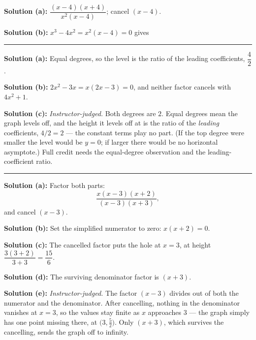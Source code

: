 \documentclass[12pt]{article}
\begin{document}

\textbf{Solution (a):} $\dfrac{(x-4)(x+4)}{x^2(x-4)}$; cancel $(x-4)$.

\textbf{Solution (b):} $x^3 - 4x^2 = x^2(x-4) = 0$ gives

\vspace{0.2cm}\noindent\rule{\linewidth}{0.2pt}\vspace{0.2cm}


\textbf{Solution (a):} Equal degrees, so the level is the ratio of the leading
coefficients, $\dfrac{4}{2}$. 

\textbf{Solution (b):} $2x^2 - 3x = x(2x-3) = 0$, and neither factor cancels with
$4x^2+1$. 

\textbf{Solution (c):} \emph{Instructor-judged.} Both degrees are $2$. Equal
degrees mean the graph levels off, and the height it levels off at is the ratio
of the \emph{leading} coefficients, $4/2 = 2$ --- the constant terms play no part.
(If the top degree were smaller the level would be $y=0$; if larger there would
be no horizontal asymptote.) Full credit needs the equal-degree observation and
the leading-coefficient ratio.

\vspace{0.2cm}\noindent\rule{\linewidth}{0.2pt}\vspace{0.2cm}


\textbf{Solution (a):} Factor both parts:
\[ \frac{x(x-3)(x+2)}{(x-3)(x+3)} , \]
and cancel $(x-3)$. 

\textbf{Solution (b):} Set the simplified numerator to zero: $x(x+2) = 0$.

\textbf{Solution (c):} The cancelled factor puts the hole at $x = 3$, at height
$\dfrac{3(3+2)}{3+3} = \dfrac{15}{6}$. 

\textbf{Solution (d):} The surviving denominator factor is $(x+3)$.

\textbf{Solution (e):} \emph{Instructor-judged.} The factor $(x-3)$ divides out
of both the numerator and the denominator. After cancelling, nothing in the
denominator vanishes at $x = 3$, so the values stay finite as $x$ approaches $3$
--- the graph simply has one point missing there, at $\bigl(3, \tfrac{5}{2}\bigr)$.
Only $(x+3)$, which survives the cancelling, sends the graph off to infinity.
\end{document}
